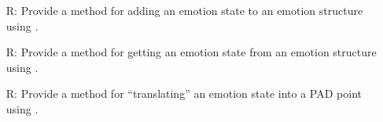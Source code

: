 \begin{itemize}
    \item[R\refstepcounter{reqnum}\thereqnum \label{R_UpdateEmotion}:] Provide
    a method for adding an emotion state to an emotion structure using
    .

    \item[R\refstepcounter{reqnum}\thereqnum \label{R_GetEmotionState}:]
    Provide a method for getting an emotion state from an emotion structure
    using .

    \item[R\refstepcounter{reqnum}\thereqnum \label{R_Convert2PAD}:] Provide a
    method for ``translating'' an emotion state into a PAD point using
    .

\end{itemize}